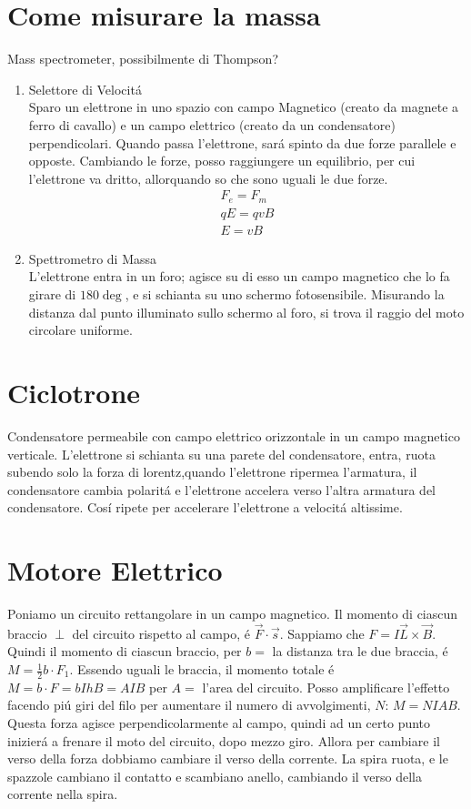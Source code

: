 \documentclass{article}
\begin{document}
\section*{Come misurare la massa}
Mass spectrometer, possibilmente di Thompson?
\begin{enumerate}

\item Selettore di Velocitá\\
Sparo un elettrone in uno spazio con campo Magnetico (creato da magnete a ferro di cavallo) e un campo elettrico (creato da un condensatore) perpendicolari. Quando passa l'elettrone, sará spinto da due forze parallele e opposte. Cambiando le forze, posso raggiungere un equilibrio, per cui l'elettrone va dritto, allorquando so che sono uguali le due forze.
\begin{gather*}
    F_e=F_m\\
    qE=qvB\\
    E=vB
\end{gather*}
\item Spettrometro di Massa\\
L'elettrone entra in un foro; agisce su di esso un campo magnetico che lo fa girare di $180\deg$, e si schianta su uno schermo fotosensibile. Misurando la distanza dal punto illuminato sullo schermo al foro, si trova il raggio del moto circolare uniforme.

\end{enumerate}
\section*{Ciclotrone}
Condensatore permeabile con campo elettrico orizzontale in un campo magnetico verticale. L'elettrone si schianta su una parete del condensatore, entra, ruota subendo solo la forza di lorentz,quando l'elettrone ripermea l'armatura, il condensatore cambia polaritá e l'elettrone accelera verso l'altra armatura del condensatore. Cosí ripete per accelerare l'elettrone a velocitá altissime.
\section*{Motore Elettrico}
Poniamo un circuito rettangolare in un campo magnetico. Il momento di ciascun braccio $\perp$ del circuito rispetto al campo, é $\vec{F}\cdot \vec{s}$. Sappiamo che $F=I\vec{L}\times \vec{B}$. Quindi il momento di ciascun braccio, per $b=$ la distanza tra le due braccia, é $M=\frac{1}{2}b\cdot F_1$. Essendo uguali le braccia, il momento totale é $M=b\cdot F=bIhB=AIB$ per $A=$ l'area del circuito. Posso amplificare l'effetto facendo piú giri del filo per aumentare il numero di avvolgimenti, $N$: $M=NIAB$. Questa forza agisce perpendicolarmente al campo, quindi ad un certo punto inizierá a frenare il moto del circuito, dopo mezzo giro. Allora per cambiare il verso della forza dobbiamo cambiare il verso della corrente. La spira ruota, e le spazzole cambiano il contatto e scambiano anello, cambiando il verso della corrente nella spira.
\end{document}
